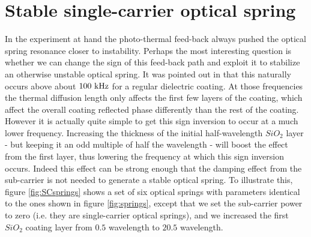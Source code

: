 \section{Stable single-carrier optical spring}
\label{sec:SCs}
In the experiment at hand the photo-thermal feed-back always pushed the optical spring resonance closer to instability.
Perhaps the most interesting question is whether we can change the sign of this feed-back path and exploit it to stabilize an otherwise unstable optical spring. It was pointed out in \cite{PhysRevD.91.023010} that this naturally occurs above about $100~{\rm kHz}$ for a regular dielectric coating. 
At those frequencies the thermal diffusion length only affects the first few layers of the coating, which affect the overall coating reflected phase differently than the rest of the coating.
However it is actually quite simple to get this sign inversion to occur at a much lower frequency. Increasing the thickness of the initial half-wavelength $SiO_2$ layer - but keeping it an odd multiple of half the wavelength - will boost the effect from the first layer, thus lowering the frequency at which this sign inversion occurs. Indeed this effect can be strong enough that the damping effect from the sub-carrier is not needed to generate a stable optical spring. To illustrate this, figure \ref{fig:SCsprings} shows a set of six optical springs with parameters identical to the ones shown in figure \ref{fig:springs}, except that we set the sub-carrier power to zero (i.e. they are single-carrier optical springs), and we increased the first $SiO_2$ coating layer from $0.5$ wavelength to $20.5$ wavelength.

